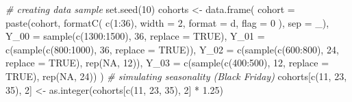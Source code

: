\documentclass[
]{book}
\newenvironment{Shaded}{\begin{snugshade}}{\end{snugshade}}
\newcommand{\AttributeTok}[1]{\textcolor[rgb]{0.77,0.63,0.00}{#1}}
\newcommand{\CommentTok}[1]{\textcolor[rgb]{0.56,0.35,0.01}{\textit{#1}}}
\newcommand{\ConstantTok}[1]{\textcolor[rgb]{0.00,0.00,0.00}{#1}}
\newcommand{\DecValTok}[1]{\textcolor[rgb]{0.00,0.00,0.81}{#1}}
\newcommand{\FloatTok}[1]{\textcolor[rgb]{0.00,0.00,0.81}{#1}}
\newcommand{\FunctionTok}[1]{\textcolor[rgb]{0.00,0.00,0.00}{#1}}
\newcommand{\NormalTok}[1]{#1}
\newcommand{\OtherTok}[1]{\textcolor[rgb]{0.56,0.35,0.01}{#1}}
\newcommand{\SpecialCharTok}[1]{\textcolor[rgb]{0.00,0.00,0.00}{#1}}
\newcommand{\StringTok}[1]{\textcolor[rgb]{0.31,0.60,0.02}{#1}}
\begin{document}
\begin{Shaded}
\begin{Highlighting}[]
\CommentTok{\# creating data sample}
\FunctionTok{set.seed}\NormalTok{(}\DecValTok{10}\NormalTok{)}
\NormalTok{cohorts }\OtherTok{\textless{}{-}}
    \FunctionTok{data.frame}\NormalTok{(}
        \AttributeTok{cohort =} \FunctionTok{paste}\NormalTok{(}\StringTok{\textquotesingle{}cohort\textquotesingle{}}\NormalTok{, }\FunctionTok{formatC}\NormalTok{(}
            \FunctionTok{c}\NormalTok{(}\DecValTok{1}\SpecialCharTok{:}\DecValTok{36}\NormalTok{),}
            \AttributeTok{width =} \DecValTok{2}\NormalTok{,}
            \AttributeTok{format =} \StringTok{\textquotesingle{}d\textquotesingle{}}\NormalTok{,}
            \AttributeTok{flag =} \StringTok{\textquotesingle{}0\textquotesingle{}}
\NormalTok{        ), }\AttributeTok{sep =} \StringTok{\textquotesingle{}\_\textquotesingle{}}\NormalTok{),}
        \AttributeTok{Y\_00 =} \FunctionTok{sample}\NormalTok{(}\FunctionTok{c}\NormalTok{(}\DecValTok{1300}\SpecialCharTok{:}\DecValTok{1500}\NormalTok{), }\DecValTok{36}\NormalTok{, }\AttributeTok{replace =} \ConstantTok{TRUE}\NormalTok{),}
        \AttributeTok{Y\_01 =} \FunctionTok{c}\NormalTok{(}\FunctionTok{sample}\NormalTok{(}\FunctionTok{c}\NormalTok{(}\DecValTok{800}\SpecialCharTok{:}\DecValTok{1000}\NormalTok{), }\DecValTok{36}\NormalTok{, }\AttributeTok{replace =} \ConstantTok{TRUE}\NormalTok{)),}
        \AttributeTok{Y\_02 =} \FunctionTok{c}\NormalTok{(}\FunctionTok{sample}\NormalTok{(}\FunctionTok{c}\NormalTok{(}\DecValTok{600}\SpecialCharTok{:}\DecValTok{800}\NormalTok{), }\DecValTok{24}\NormalTok{, }\AttributeTok{replace =} \ConstantTok{TRUE}\NormalTok{), }\FunctionTok{rep}\NormalTok{(}\ConstantTok{NA}\NormalTok{, }\DecValTok{12}\NormalTok{)),}
        \AttributeTok{Y\_03 =} \FunctionTok{c}\NormalTok{(}\FunctionTok{sample}\NormalTok{(}\FunctionTok{c}\NormalTok{(}\DecValTok{400}\SpecialCharTok{:}\DecValTok{500}\NormalTok{), }\DecValTok{12}\NormalTok{, }\AttributeTok{replace =} \ConstantTok{TRUE}\NormalTok{), }\FunctionTok{rep}\NormalTok{(}\ConstantTok{NA}\NormalTok{, }\DecValTok{24}\NormalTok{))}
\NormalTok{    )}
\CommentTok{\# simulating seasonality (Black Friday)}
\NormalTok{cohorts[}\FunctionTok{c}\NormalTok{(}\DecValTok{11}\NormalTok{, }\DecValTok{23}\NormalTok{, }\DecValTok{35}\NormalTok{), }\DecValTok{2}\NormalTok{] }\OtherTok{\textless{}{-}}
    \FunctionTok{as.integer}\NormalTok{(cohorts[}\FunctionTok{c}\NormalTok{(}\DecValTok{11}\NormalTok{, }\DecValTok{23}\NormalTok{, }\DecValTok{35}\NormalTok{), }\DecValTok{2}\NormalTok{] }\SpecialCharTok{*} \FloatTok{1.25}\NormalTok{)}

\end{Highlighting}
\end{Shaded}
\end{document}
